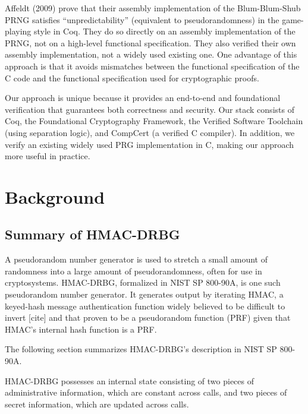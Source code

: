 \documentclass[12pt,lot, lof]{puthesis}
\begin{document}
Affeldt (2009) prove that their assembly implementation of the Blum-Blum-Shub PRNG satisfies ``unpredictability'' (equivalent to pseudorandomness) in the game-playing style in Coq. They do so directly on an assembly implementation of the PRNG, not on a high-level functional specification. They also verified their own assembly implementation, not a widely used existing one. One advantage of this approach is that it avoids mismatches between the functional specification of the C code and the functional specification used for cryptographic proofs.

Our approach is unique because it provides an end-to-end and foundational verification that guarantees both correctness and security. Our stack consists of Coq, the Foundational Cryptography Framework, the Verified Software Toolchain (using separation logic), and CompCert (a verified C compiler). In addition, we verify an existing widely used PRG implementation in C, making our approach more useful in practice. 



\chapter{Background} \label{sec:background}

\section{Summary of HMAC-DRBG} \label{sec:summary_of_hmac_drbg}
A pseudorandom number generator is used to stretch a small amount of randomness into a large amount of pseudorandomness, often for use in cryptosystems. HMAC-DRBG, formalized in NIST SP 800-90A, is one such pseudorandom number generator. It generates output by iterating HMAC, a keyed-hash message authentication function widely believed to be difficult to invert [cite] and that proven to be a pseudorandom function (PRF) given that HMAC's internal hash function is a PRF. %

The following section summarizes HMAC-DRBG's description in NIST SP 800-90A.

HMAC-DRBG possesses an internal state consisting of two pieces of administrative information, which are constant across calls, and two pieces of secret information, which are updated across calls.
\end{document}
